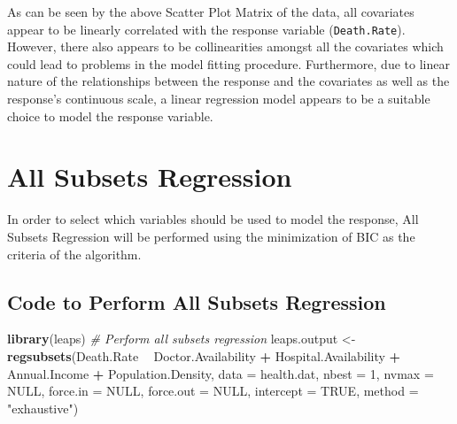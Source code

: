 \documentclass[12pt,]{article}
\newenvironment{Shaded}{\begin{snugshade}}{\end{snugshade}}
\newcommand{\KeywordTok}[1]{\textcolor[rgb]{0.13,0.29,0.53}{\textbf{#1}}}
\newcommand{\DataTypeTok}[1]{\textcolor[rgb]{0.13,0.29,0.53}{#1}}
\newcommand{\DecValTok}[1]{\textcolor[rgb]{0.00,0.00,0.81}{#1}}
\newcommand{\StringTok}[1]{\textcolor[rgb]{0.31,0.60,0.02}{#1}}
\newcommand{\CommentTok}[1]{\textcolor[rgb]{0.56,0.35,0.01}{\textit{#1}}}
\newcommand{\OtherTok}[1]{\textcolor[rgb]{0.56,0.35,0.01}{#1}}
\newcommand{\OperatorTok}[1]{\textcolor[rgb]{0.81,0.36,0.00}{\textbf{#1}}}
\newcommand{\NormalTok}[1]{#1}
\begin{document}
As can be seen by the above Scatter Plot Matrix of the data, all
covariates appear to be linearly correlated with the response variable
(\texttt{Death.Rate}). However, there also appears to be collinearities
amongst all the covariates which could lead to problems in the model
fitting procedure. Furthermore, due to linear nature of the
relationships between the response and the covariates as well as the
response's continuous scale, a linear regression model appears to be a
suitable choice to model the response variable.

\section{All Subsets Regression}\label{all-subsets-regression}

In order to select which variables should be used to model the response,
All Subsets Regression will be performed using the minimization of BIC
as the criteria of the algorithm.

\subsection{Code to Perform All Subsets
Regression}\label{code-to-perform-all-subsets-regression}

\begin{Shaded}
\begin{Highlighting}[]
\KeywordTok{library}\NormalTok{(leaps)}
\CommentTok{# Perform all subsets regression}
\NormalTok{leaps.output <-}\StringTok{ }\KeywordTok{regsubsets}\NormalTok{(Death.Rate }\OperatorTok{~}\StringTok{ }\NormalTok{Doctor.Availability }\OperatorTok{+}
\StringTok{                           }\NormalTok{Hospital.Availability }\OperatorTok{+}\StringTok{ }\NormalTok{Annual.Income }\OperatorTok{+}
\StringTok{                           }\NormalTok{Population.Density,}
                           \DataTypeTok{data =}\NormalTok{ health.dat,}
                           \DataTypeTok{nbest =} \DecValTok{1}\NormalTok{,}
                           \DataTypeTok{nvmax =} \OtherTok{NULL}\NormalTok{,}
                           \DataTypeTok{force.in =} \OtherTok{NULL}\NormalTok{,}
                           \DataTypeTok{force.out =} \OtherTok{NULL}\NormalTok{,}
                           \DataTypeTok{intercept =} \OtherTok{TRUE}\NormalTok{,}
                           \DataTypeTok{method =} \StringTok{"exhaustive"}\NormalTok{)}
\end{Highlighting}
\end{Shaded}
\end{document}

